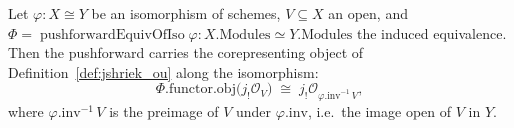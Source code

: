 
\begin{lemma}
  \label{lem:jshriek_transport_along_iso}
  Let \(\varphi : X \cong Y\) be an isomorphism of schemes, \(V \subseteq X\) an open, and
  \(\Phi = \operatorname{pushforwardEquivOfIso}\varphi : X.\mathrm{Modules} \simeq Y.\mathrm{Modules}\)
  the induced equivalence. Then the pushforward carries the corepresenting object of
  Definition~\ref{def:jshriek_ou} along the isomorphism:
  \[
    \Phi.\mathrm{functor}.\mathrm{obj}\bigl(j_!\mathcal{O}_V\bigr)
      \;\cong\;
    j_!\mathcal{O}_{\varphi.\mathrm{inv}^{-1}\,V},
  \]
  where \(\varphi.\mathrm{inv}^{-1}\,V\) is the preimage of \(V\) under \(\varphi.\mathrm{inv}\), i.e.\
  the image open of \(V\) in \(Y\).
\end{lemma}
